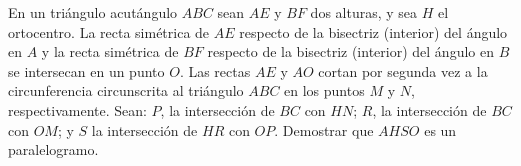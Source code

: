 En un triángulo acutángulo $ABC$ sean $AE$ y $BF$ dos alturas, y sea $H$ el ortocentro. La recta simétrica de $AE$ respecto de la bisectriz (interior) del ángulo en $A$ y la recta simétrica de $BF$ respecto de la bisectriz (interior) del ángulo en $B$ se intersecan en un punto $O$. Las rectas $AE$ y $AO$ cortan por segunda vez a la circunferencia circunscrita al triángulo $ABC$ en los puntos $M$ y $N$, respectivamente. \newline 
Sean: $P$, la intersección de $BC$ con $HN$; $R$, la intersección de $BC$ con $OM$; y $S$ la intersección de $HR$ con $OP$. Demostrar que $AHSO$ es un paralelogramo.
